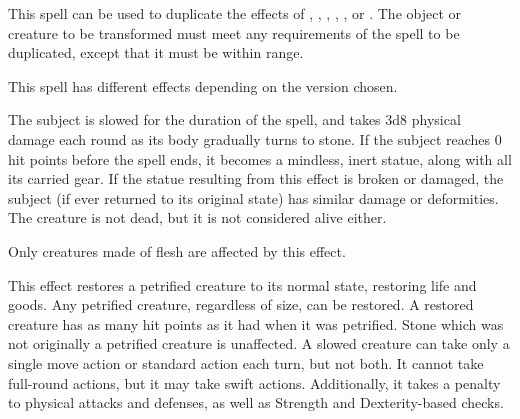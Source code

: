 \spelleffect This spell can be used to duplicate the effects of , , , , , or . The object or creature to be transformed must meet any requirements of the spell to be duplicated, except that it must be within \rngmed range.

\spelleffect This spell has different effects depending on the version chosen.
\par {} The subject is slowed for the duration of the spell, and takes 3d8 physical damage each round as its body gradually turns to stone. If the subject reaches 0 hit points before the spell ends, it becomes a mindless, inert statue, along with all its carried gear. If the statue resulting from this effect is broken or damaged, the subject (if ever returned to its original state) has similar damage or deformities. The creature is not dead, but it is not considered alive either.
\par Only creatures made of flesh are affected by this effect.
\par {} This effect restores a petrified creature to its normal state, restoring life and goods. Any petrified creature, regardless of size, can be restored. A restored creature has as many hit points as it had when it was petrified. Stone which was not originally a petrified creature is unaffected.
\spellnotes A slowed creature can take only a single move action or standard action each turn, but not both. It cannot take full-round actions, but it may take swift actions. Additionally, it takes a  penalty to physical attacks and defenses, as well as Strength and Dexterity-based checks.

